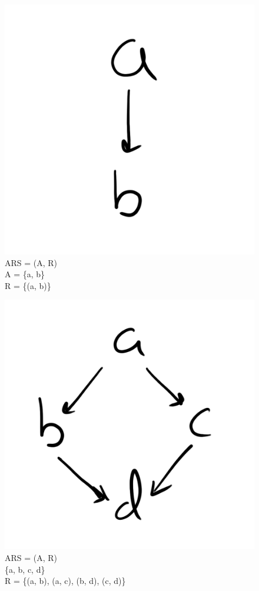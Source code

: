 \documentclass{article}
\begin{document}
{\begin{figure}[h!]
  \centering
  \includegraphics[scale=0.06]{gen11}
  \caption[] {
     ARS = (A, R) \\ A = \{a, b\} \\ R = \{(a, b)\}
    \endtabular}
\end{figure}

\begin{figure}[h!]
  \centering
  \includegraphics[scale=0.06]{gen12}
  \caption[] {
     ARS = (A, R) \\ \{a, b, c, d\} \\ R = \{(a, b), (a, c), (b, d), (c, d)\}
    \endtabular}
\end{figure}

}
\end{document}
